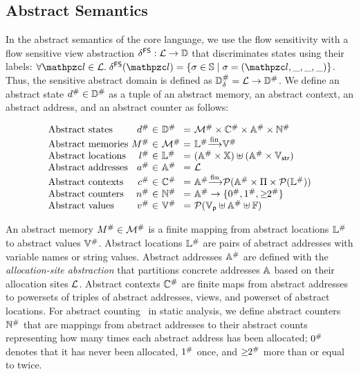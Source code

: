 \subsection{Abstract Semantics}
In the abstract semantics of the core language, we use the flow sensitivity with a
flow sensitive view abstraction $\delta^{\textsf{FS}}: \mathcal{L} \rightarrow \mathbb{D}$ that
discriminates states using their labels: $\forall \lab \in \labset. \;
\fsviewmap(\lab) = \{ \st \in \stset \mid \st = (\lab, \_, \_, \_) \}$. Thus, the
sensitive abstract domain is defined as ${\mathbb{D}}^{\#}_\delta = \mathcal{L} \rightarrow
{\mathbb{D}}^{\#}$.  We define an abstract state ${d}^{\#} \in {\mathbb{D}}^{\#}$ as a tuple of an
abstract memory, an abstract context, an abstract address, and an
abstract counter as follows:

\[
  \begin{array}{l@{~}r@{~}c@{~}l@{~}c@{~}l}
\text{Abstract states} & \abselem &\in& \absdom &=& \absmemset \times \absctxtset
\times \absaddrset \times \abscountset\\
\text{Abstract memories} & \absmem &\in& \absmemset &=& \abslocset \finmap
\absvalset\\
\text{Abstract locations} & \absloc &\in& \abslocset &=& (\absaddrset \times
\varset) \uplus (\absaddrset \times \strset)\\
\text{Abstract addresses} & \absaddr &\in& \absaddrset &=& \labset\\
\text{Abstract contexts} & \absctxt &\in& \absctxtset &=& \absaddrset \finmap
\powerset{\absaddrset \times \viewset \times \powerset{\abslocset}}\\
\text{Abstract counters} & \abscount &\in& \abscountset &=& \absaddrset
\rightarrow \{ \abszero, \absone, \absmany \}\\
\text{Abstract values} & \absval &\in& \absvalset &=& \powerset{\pvalset
\uplus \absaddrset \uplus \fvalset}\\
  \end{array}
\]

An abstract memory ${M}^{\#} \in {\mathcal{M}}^{\#}$ is a finite mapping from abstract
locations ${\mathbb{L}}^{\#}$ to abstract values ${\mathbb{V}}^{\#}$.  Abstract locations
${\mathbb{L}}^{\#}$ are pairs of abstract addresses with variable names or string
values. Abstract addresses ${\mathbb{A}}^{\#}$ are defined with the
\textit{allocation-site abstraction} that partitions concrete addresses
$\mathbb{A}$ based on their allocation sites $\mathcal{L}$.  Abstract contexts
${\mathbb{C}}^{\#}$ are finite maps from abstract addresses to powersets of triples of
abstract addresses, views, and powerset of abstract locations.  For abstract
counting~\cite{abstract-gc-counting, revisit-recency} in static analysis, we
define abstract counters ${\mathbb{N}}^{\#}$ that are mappings from abstract addresses to
their abstract counts representing how many times each abstract address has been
allocated; ${0}^{\#}$ denotes that it has never been allocated, ${1}^{\#}$ once,
and ${\geq\!\!2}^{\#}$ more than or equal to twice.

